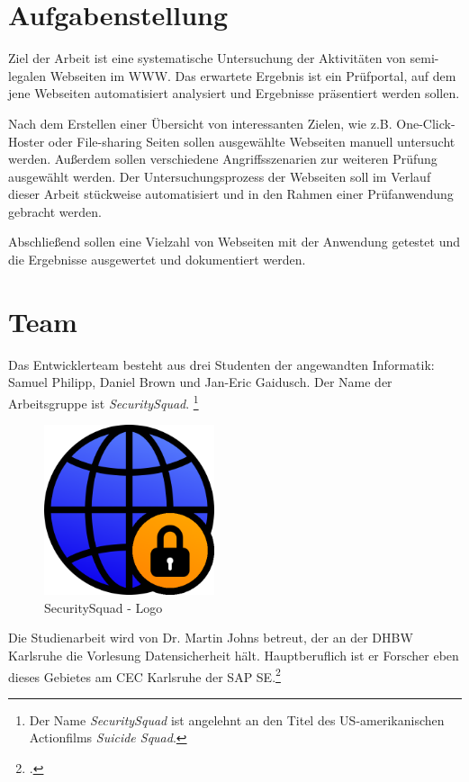 \section{Aufgabenstellung}
Ziel der Arbeit ist eine systematische Untersuchung der Aktivitäten von semi-legalen Webseiten im
\ac{WWW}. Das erwartete Ergebnis ist ein Prüfportal, auf dem jene Webseiten automatisiert
analysiert und Ergebnisse präsentiert werden sollen.

Nach dem Erstellen einer Übersicht von interessanten Zielen, wie z.B. One-Click-Hoster oder
File-sharing Seiten sollen ausgewählte Webseiten manuell untersucht werden. Außerdem sollen
verschiedene Angriffsszenarien zur weiteren Prüfung ausgewählt werden. Der Untersuchungsprozess der
Webseiten soll im Verlauf dieser Arbeit stückweise automatisiert und in den Rahmen einer
Prüfanwendung gebracht werden.

Abschließend sollen eine Vielzahl von Webseiten mit der Anwendung getestet und die Ergebnisse
ausgewertet und dokumentiert werden.

\section{Team}
Das Entwicklerteam besteht aus drei Studenten der angewandten Informatik:
Samuel Philipp, Daniel Brown und Jan-Eric Gaidusch.
Der Name der Arbeitsgruppe ist \textit{SecuritySquad}.
\footnote{Der Name \textit{SecuritySquad} ist angelehnt an den Titel des US-amerikanischen Actionfilms \textit{Suicide Squad}.}

\begin{figure}[H]
	\centering
	\includegraphics[width=5cm]{images/securitysquad}
	\caption{SecuritySquad - Logo}
	\label{fig:securitysquad-logo}
\end{figure}

Die Studienarbeit wird von Dr. Martin Johns betreut, der an der DHBW Karlsruhe die Vorlesung Datensicherheit hält. Hauptberuflich ist er Forscher eben dieses Gebietes am CEC Karlsruhe der SAP SE.\footcite[Vgl.][]{johnsProfile}


